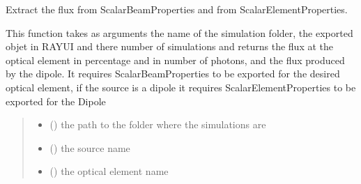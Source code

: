 \documentclass[letterpaper,10pt,english]{sphinxmanual}
\begin{document}
\begin{fulllineitems}
\begin{fulllineitems}
\begin{quote}
\begin{description}
\end{description}\end{quote}

\end{fulllineitems}


\begin{fulllineitems}
\label{\detokenize{API:raypyng.postprocessing.PostProcessAnalyzed.retrieve_flux_beamline}}
\pysigstartsignatures
\pysiglinewithargsret
{}
{\sphinxparamcomma {}\sphinxparamcomma {}\sphinxparamcomma {}\sphinxparamcomma {}\sphinxparamcomma {}}
{}
\pysigstopsignatures
\sphinxAtStartPar
Extract the flux from ScalarBeamProperties and from ScalarElementProperties.

\sphinxAtStartPar
This function takes as arguments the name of the
simulation folder, the exported objet in RAY\sphinxhyphen{}UI and there
number of simulations and returns the flux at the optical element in
percentage and in number of photons, and the flux produced
by the dipole.
It requires ScalarBeamProperties to be exported for the desired optical element,
if the source is a dipole it requires ScalarElementProperties to be exported for the Dipole
\begin{quote}\begin{description}
\begin{itemize}
\item {} 
\sphinxAtStartPar
{} () \textendash{} the path to the folder where the simulations are

\item {} 
\sphinxAtStartPar
{} () \textendash{} the source name

\item {} 
\sphinxAtStartPar
{} () \textendash{} the optical element name


\end{itemize}
\end{description}
\end{quote}
\end{fulllineitems}
\end{fulllineitems}
\end{document}
